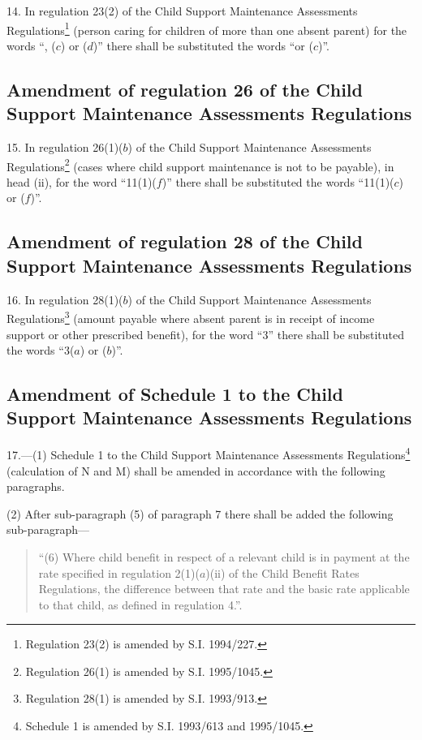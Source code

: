 \documentclass[a4paper]{article}
\begin{document}
14.  In regulation 23(2) of the Child Support Maintenance Assessments Regulations\footnote{\frenchspacing Regulation 23(2) is amended by S.I. 1994/227.} (person caring for children of more than one absent parent) for the words “, ($c$) or ($d$)” there shall be substituted the words “or ($c$)”.

\subsection[15. Amendment of regulation 26 of the Child Support Maintenance Assessments Regulations]{\sloppy Amendment of regulation 26 of the Child Support Maintenance Assessments Regulations}

15.  In regulation 26(1)($b$) of the Child Support Maintenance Assessments Regulations\footnote{\frenchspacing Regulation 26(1) is amended by S.I. 1995/1045.} (cases where child support maintenance is not to be payable), in head (ii), for the word “11(1)($f$)” there shall be substituted the words “11(1)($c$) or ($f$)”.

\subsection[16. Amendment of regulation 28 of the Child Support Maintenance Assessments Regulations]{\sloppy Amendment of regulation 28 of the Child Support Maintenance Assessments Regulations}

16.  In regulation 28(1)($b$) of the Child Support Maintenance Assessments Regulations\footnote{\frenchspacing Regulation 28(1) is amended by S.I. 1993/913.} (amount payable where absent parent is in receipt of income support or other prescribed benefit), for the word “3” there shall be substituted the words “3($a$) or ($b$)”.

\subsection[17. Amendment of Schedule 1 to the Child Support Maintenance Assessments Regulations]{Amendment of Schedule 1 to the Child Support Maintenance Assessments Regulations}

17.—(1) Schedule 1 to the Child Support Maintenance Assessments Regulations\footnote{\frenchspacing Schedule 1 is amended by S.I. 1993/613 and 1995/1045.} (calculation of N and M) shall be amended in accordance with the following paragraphs.

(2) After sub-paragraph (5) of paragraph 7 there shall be added the following sub-paragraph—
\begin{quotation}
“(6) Where child benefit in respect of a relevant child is in payment at the rate specified in regulation 2(1)($a$)(ii) of the Child Benefit Rates Regulations, the difference between that rate and the basic rate applicable to that child, as defined in regulation 4.”.
\end{quotation}
\end{document}
